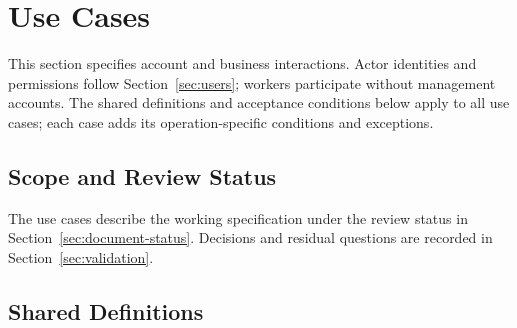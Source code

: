 \section{Use Cases}
\label{sec:use-cases}

This section specifies account and business interactions. Actor identities and
permissions follow Section~\ref{sec:users}; workers participate without management
accounts. The shared definitions and acceptance conditions below apply to all
use cases; each case adds its operation-specific conditions and exceptions.

\subsection{Scope and Review Status}
The use cases describe the working specification under the review status in
Section~\ref{sec:document-status}. Decisions and residual questions are recorded
in Section~\ref{sec:validation}.

\subsection{Shared Definitions}
\label{sec:uc-shared-definitions}
\label{sec:shared-definitions}

